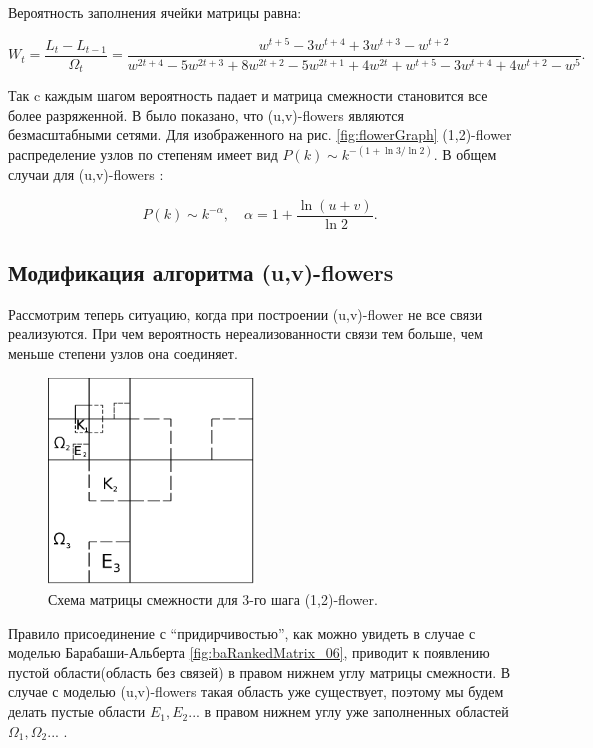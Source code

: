 \documentclass[10pt,aps,pra]{revtex4-1}
\begin{document}
        Вероятность заполнения ячейки матрицы равна:

            \begin{equation}
                W_t=\frac{L_t-L_{t-1}}{\Omega_t}=\frac{w^{t+5}-3w^{t+4}+3w^{t+3}-w^{t+2}}{w^{2t+4}-5w^{2t+3}+8w^{2t+2}-5w^{2t+1}+4w^{2t}+w^{t+5}-3w^{t+4}+4w^{t+2}-w^5}.
            \end{equation}

        Так c каждым шагом вероятность падает и матрица смежности становится все более разряженной.
        В \cite{Dor1} было показано, что (u,v)-flowers являются безмасштабными сетями. Для изображенного на рис. \ref{fig:flowerGraph} (1,2)-flower распределение узлов по степеням имеет вид $P(k) \sim k^{-(1+\ln{3} / \ln{2})}$. В общем случаи для (u,v)-flowers \cite{Rozenfeld1}:

            \begin{equation}
                P(k) \sim k^{-\alpha}, \quad \alpha = 1+\frac{\ln{(u+v)}}{\ln{2}}.
            \end{equation}

    \subsection{Модификация алгоритма (u,v)-flowers}

        Рассмотрим теперь ситуацию, когда при построении (u,v)-flower не все связи реализуются. При чем вероятность нереализованности связи тем больше, чем меньше степени узлов она соединяет.

            \begin{figure}[H]
                \centering
                \includegraphics[height=5.5cm]{graphics/third_n.png}
                \caption{
                \label{fig:flowerMatrixExceptive}
                    Схема матрицы смежности для 3-го шага (1,2)-flower.}
            \end{figure}

        Правило присоединение с ``придирчивостью'', как можно увидеть в случае с моделью Барабаши-Альберта \ref{fig:baRankedMatrix_06}, приводит к появлению пустой области(область без связей) в правом нижнем углу матрицы смежности. В случае с моделью (u,v)-flowers такая область уже существует, поэтому мы будем делать пустые области $E_1, E_2...$  в правом нижнем углу уже заполненных областей $\Omega_1, \Omega_2...$ .
\end{document}
